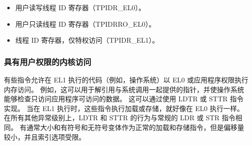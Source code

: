\begin{itemize}
\item
  用户读写线程 ID 寄存器（TPIDR\_EL0）。
\item
  用户只读线程 ID 寄存器（TPIDRRO\_EL0）。
\item
  线程 ID 寄存器，仅特权访问（TPIDR\_EL1）。
\end{itemize}

\subsubsection{具有用户权限的内核访问}

有些指令允许在 EL1 执行的代码（例如，操作系统）以 EL0 或应用程序权限执行内存访问。
例如，这可以用于解引用与系统调用一起提供的指针，并使操作系统能够检查只访问应用程序可访问的数据。
这可以通过使用 LDTR 或 STTR 指令实现。
当在 EL1 执行时，这些指令执行加载或存储，就好像在 EL0 执行一样。
在所有其他异常级别上，LDTR 和 STTR 的行为与常规的 LDR 或 STR 指令相同。
有通常大小和有符号和无符号变体作为正常的加载和存储指令，但是偏移量较小，并且索引选项受限。

